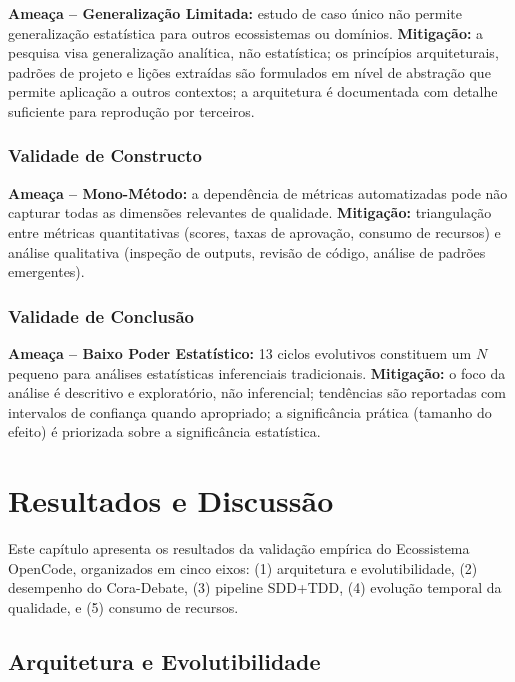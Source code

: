 \documentclass[12pt,a4paper,sumario=tradicional,openany]{abntex2}
\begin{document}
\textbf{Ameaça -- Generalização Limitada:} estudo de caso único não permite generalização estatística para outros ecossistemas ou domínios. \textbf{Mitigação:} a pesquisa visa generalização analítica, não estatística; os princípios arquiteturais, padrões de projeto e lições extraídas são formulados em nível de abstração que permite aplicação a outros contextos; a arquitetura é documentada com detalhe suficiente para reprodução por terceiros.

\subsection{Validade de Constructo}

\textbf{Ameaça -- Mono-Método:} a dependência de métricas automatizadas pode não capturar todas as dimensões relevantes de qualidade. \textbf{Mitigação:} triangulação entre métricas quantitativas (scores, taxas de aprovação, consumo de recursos) e análise qualitativa (inspeção de outputs, revisão de código, análise de padrões emergentes).

\subsection{Validade de Conclusão}

\textbf{Ameaça -- Baixo Poder Estatístico:} 13 ciclos evolutivos constituem um $N$ pequeno para análises estatísticas inferenciais tradicionais. \textbf{Mitigação:} o foco da análise é descritivo e exploratório, não inferencial; tendências são reportadas com intervalos de confiança quando apropriado; a significância prática (tamanho do efeito) é priorizada sobre a significância estatística.

\chapter{Resultados e Discussão}

Este capítulo apresenta os resultados da validação empírica do Ecossistema OpenCode, organizados em cinco eixos: (1) arquitetura e evolutibilidade, (2) desempenho do Cora-Debate, (3) pipeline SDD+TDD, (4) evolução temporal da qualidade, e (5) consumo de recursos.

\section{Arquitetura e Evolutibilidade}
\end{document}
